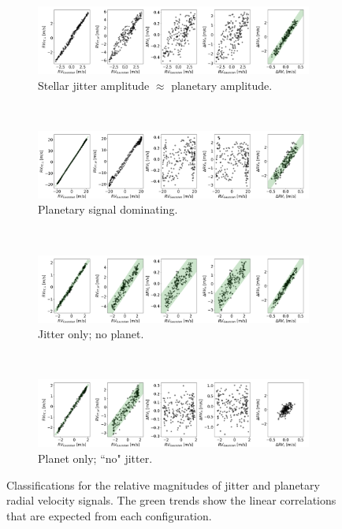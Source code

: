 \begin{figure}[htbp]	
    \begin{subfigure}[b]{1.0\textwidth}
        \includegraphics[width=\textwidth]{./Figures/Methods/Correlation_2pj.png}
        \caption{Stellar jitter amplitude $\approx$ planetary amplitude.}
    \end{subfigure}
	~
    \begin{subfigure}[b]{1.0\textwidth}
        \includegraphics[width=\textwidth]{./Figures/Methods/Correlation_20pj.png}
        \caption{Planetary signal dominating.}
    \end{subfigure}	
	~
    \begin{subfigure}[b]{1.0\textwidth}
        \includegraphics[width=\textwidth]{./Figures/Methods/Correlation_null.png}
        \caption{Jitter only; no planet.}
    \end{subfigure}	    
	~
    \begin{subfigure}[b]{1.0\textwidth}
        \includegraphics[width=\textwidth]{./Figures/Methods/Correlation_0jitter.png}
        \caption{Planet only; ``no" jitter.}
    \end{subfigure}	    
    \caption[Classification of jitter dominated or planetary signal dominated]        
    {Classifications for the relative magnitudes of jitter and planetary radial velocity signals. The green trends show the linear correlations that are expected from each configuration.}
\label{fig:correlations}
\end{figure}    

